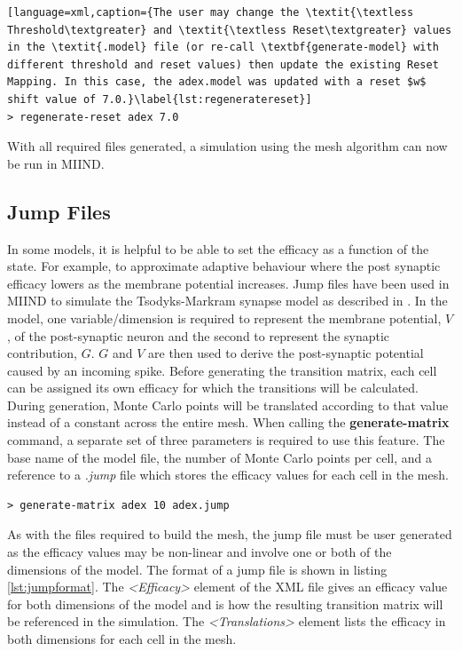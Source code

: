 \documentclass[utf8]{frontiersSCNS} %
\begin{document}
\begin{lstlisting}[language=xml,caption={The user may change the \textit{\textless Threshold\textgreater} and \textit{\textless Reset\textgreater} values in the \textit{.model} file (or re-call \textbf{generate-model} with different threshold and reset values) then update the existing Reset Mapping. In this case, the adex.model was updated with a reset $w$ shift value of 7.0.}\label{lst:regeneratereset}]
> regenerate-reset adex 7.0
\end{lstlisting}

With all required files generated, a simulation using the mesh algorithm can now be run in MIIND.\\

\subsection{Jump Files}
In some models, it is helpful to be able to set the efficacy as a function of the state. For example, to approximate adaptive behaviour where the post synaptic efficacy lowers as the membrane potential increases. Jump files have been used in MIIND to simulate the Tsodyks-Markram \citep{tsodyks1997neural} synapse model as described in \cite{de2019computational}. In the model, one variable/dimension is required to represent the membrane potential, $V$, of the post-synaptic neuron and the second to represent the synaptic contribution, $G$. $G$ and $V$ are then used to derive the post-synaptic potential caused by an incoming spike. Before generating the transition matrix, each cell can be assigned its own efficacy for which the transitions will be calculated. During generation, Monte Carlo points will be translated according to that value instead of a constant across the entire mesh. When calling the \textbf{generate-matrix} command, a separate set of three parameters is required to use this feature. The base name of the model file, the number of Monte Carlo points per cell, and a reference to a \textit{.jump} file which stores the efficacy values for each cell in the mesh. 

\begin{lstlisting}[language=xml,caption={Generate a transition matrix with a jump file in the CLI}]
> generate-matrix adex 10 adex.jump
\end{lstlisting}

As with the files required to build the mesh, the jump file must be user generated as the efficacy values may be non-linear and involve one or both of the dimensions of the model. The format of a jump file is shown in listing \ref{lst:jumpformat}. The \textit{\textless Efficacy\textgreater} element of the XML file gives an efficacy value for both dimensions of the model and is how the resulting transition matrix will be referenced in the simulation. The \textit{\textless Translations\textgreater} element lists the efficacy in both dimensions for each cell in the mesh.
\end{document}
